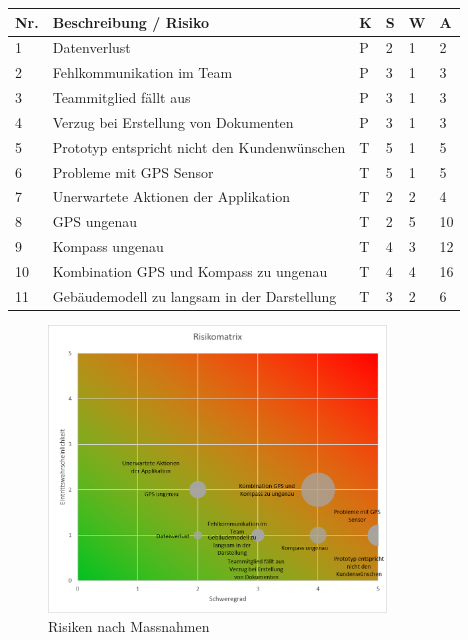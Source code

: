 \documentclass[a4paper]{scrreprt}
\begin{document}
\vspace{1em}
\noindent
\begin{tabular}{|p{}|p{}|p{}|p{}|p{}||p{}|}
	\hline
	\textbf{Nr.} & \textbf{Beschreibung / Risiko} & \textbf{K} & \textbf{S} & \textbf{W} & \textbf{A} \\
	\hline
	1 & Datenverlust & P & 2 & 1 & 2\\
	\hline
	2 & Fehlkommunikation im Team & P & 3 & 1 & 3 \\
	\hline
	3 & Teammitglied fällt aus & P & 3 & 1 & 3 \\
	\hline
	4 & Verzug bei Erstellung von Dokumenten & P & 3 & 1 & 3 \\
	\hline
	5 & Prototyp entspricht nicht den Kundenwünschen & T & 5 & 1 & 5 \\
	\hline
	6 & Probleme mit GPS Sensor & T & 5 & 1 & 5 \\
	\hline
	7 & Unerwartete Aktionen der Applikation & T & 2 & 2 & 4\\
	\hline
	8 & GPS ungenau & T & 2 & 5 & 10\\
	\hline
	9 & Kompass ungenau & T & 4 & 3 & 12\\
	\hline
	10 & Kombination GPS und Kompass zu ungenau & T & 4 & 4 & 16\\
	\hline
	11 & Gebäudemodell zu langsam in der Darstellung & T & 3 & 2 & 6\\
	\hline
\end{tabular}

\vspace{1em}

\begin{figure}[h!]
	\centering
	\includegraphics[keepaspectratio, width=0.8\textwidth]{RisikoMatrix_nach_Massnahmen}
	\caption{Risiken nach Massnahmen}
\end{figure}
\end{document}
